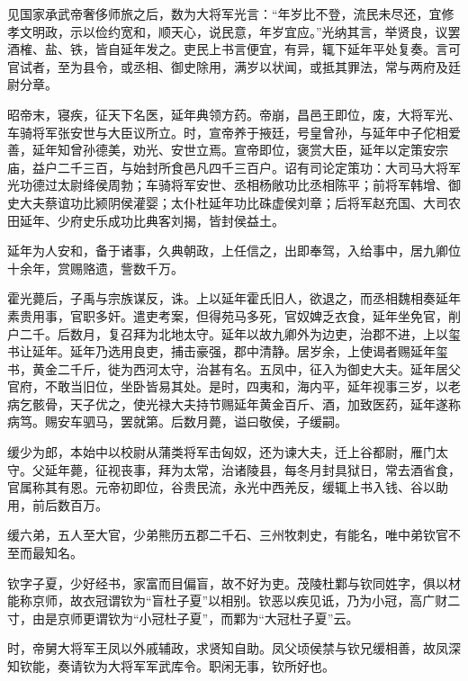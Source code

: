 \documentclass[12pt,UTF8]{ctexbook}
\begin{document}
见国家承武帝奢侈师旅之后，数为大将军光言：“年岁比不登，流民未尽还，宜修孝文明政，示以俭约宽和，顺天心，说民意，年岁宜应。”光纳其言，举贤良，议罢酒榷、盐、铁，皆自延年发之。吏民上书言便宜，有异，辄下延年平处复奏。言可官试者，至为县令，或丞相、御史除用，满岁以状闻，或抵其罪法，常与两府及廷尉分章。



昭帝末，寝疾，征天下名医，延年典领方药。帝崩，昌邑王即位，废，大将军光、车骑将军张安世与大臣议所立。时，宣帝养于掖廷，号皇曾孙，与延年中子佗相爱善，延年知曾孙德美，劝光、安世立焉。宣帝即位，褒赏大臣，延年以定策安宗庙，益户二千三百，与始封所食邑凡四千三百户。诏有司论定策功：大司马大将军光功德过太尉绛侯周勃；车骑将军安世、丞相杨敞功比丞相陈平；前将军韩增、御史大夫蔡谊功比颍阴侯灌婴；太仆杜延年功比硃虚侯刘章；后将军赵充国、大司农田延年、少府史乐成功比典客刘揭，皆封侯益土。



延年为人安和，备于诸事，久典朝政，上任信之，出即奉驾，入给事中，居九卿位十余年，赏赐赂遗，訾数千万。



霍光薨后，子禹与宗族谋反，诛。上以延年霍氏旧人，欲退之，而丞相魏相奏延年素贵用事，官职多奸。遣吏考案，但得苑马多死，官奴婢乏衣食，延年坐免官，削户二千。后数月，复召拜为北地太守。延年以故九卿外为边吏，治郡不进，上以玺书让延年。延年乃选用良吏，捕击豪强，郡中清静。居岁余，上使谒者赐延年玺书，黄金二千斤，徙为西河太守，治甚有名。五凤中，征入为御史大夫。延年居父官府，不敢当旧位，坐卧皆易其处。是时，四夷和，海内平，延年视事三岁，以老病乞骸骨，天子优之，使光禄大夫持节赐延年黄金百斤、酒，加致医药，延年遂称病笃。赐安车驷马，罢就第。后数月薨，谥曰敬侯，子缓嗣。



缓少为郎，本始中以校尉从蒲类将军击匈奴，还为谏大夫，迁上谷都尉，雁门太守。父延年薨，征视丧事，拜为太常，治诸陵县，每冬月封具狱日，常去酒省食，官属称其有恩。元帝初即位，谷贵民流，永光中西羌反，缓辄上书入钱、谷以助用，前后数百万。



缓六弟，五人至大官，少弟熊历五郡二千石、三州牧刺史，有能名，唯中弟钦官不至而最知名。



钦字子夏，少好经书，家富而目偏盲，故不好为吏。茂陵杜鄴与钦同姓字，俱以材能称京师，故衣冠谓钦为“盲杜子夏”以相别。钦恶以疾见诋，乃为小冠，高广财二寸，由是京师更谓钦为“小冠杜子夏”，而鄴为“大冠杜子夏”云。



时，帝舅大将军王凤以外戚辅政，求贤知自助。凤父顷侯禁与钦兄缓相善，故凤深知钦能，奏请钦为大将军军武库令。职闲无事，钦所好也。
\end{document}
